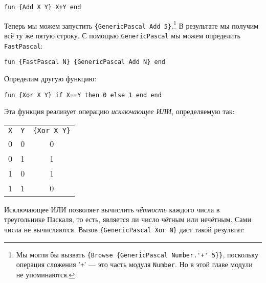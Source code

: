 \begin{lstlisting}
fun {Add X Y} X+Y end
\end{lstlisting}

\VerbatimFootnotes
Теперь мы можем запустить \lstinline|{GenericPascal Add 5}|.\footnote{Мы могли бы вызвать \verb|{Browse {GenericPascal Number.'+' 5}}|, поскольку операция сложения  '\lstinline|+|' --- это часть модуля \lstinline|Number|. Но в этой главе модули не упоминаются.} В результате мы получим всё ту же пятую строку. С помощью \lstinline|GenericPascal| мы можем определить \lstinline|FastPascal|:

\begin{lstlisting}
fun {FastPascal N} {GenericPascal Add N} end
\end{lstlisting}

Определим другую функцию:

\begin{lstlisting}
fun {Xor X Y} if X==Y then 0 else 1 end end
\end{lstlisting}

Эта функция реализует операцию \emph{исключающее ИЛИ}, определяемую так:

\begin{center}
\begin{tabular}{ccc}
\lstinline|X| & \lstinline|Y| & \lstinline|{Xor X Y}| \\
0 & 0 & 0 \\
0 & 1 & 1 \\
1 & 0 & 1 \\
1 & 1 & 0 \\
\end{tabular}
\end{center}

Исключающее ИЛИ позволяет вычислить \emph{чётность} каждого числа в треугольнике Паскаля, то есть, является ли число чётным или нечётным. Сами числа не вычисляются. Вызов \lstinline|{GenericPascal Xor N}| даст такой результат:

